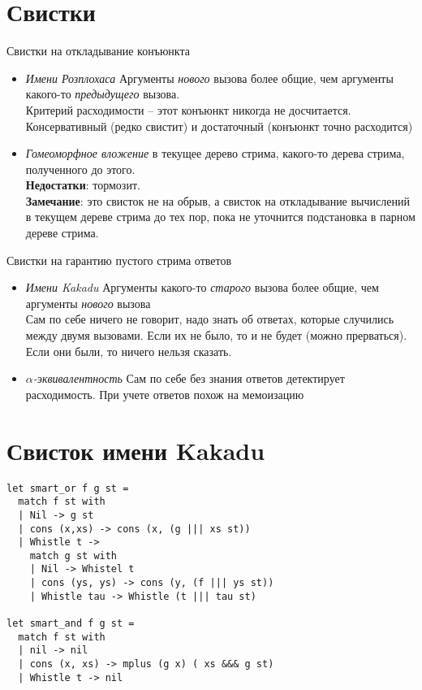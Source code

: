 \documentclass[a5paper,12pt]{article}
\begin{document}
\section{Свистки}

Свистки на откладывание конъюнкта
\begin{itemize}
\item \textit{Имени Розплохаса} Аргументы \textit{нового} вызова более общие, чем аргументы какого-то \textit{предыдущего} вызова.\\
Критерий расходимости -- этот конъюнкт никогда не досчитается.
Консервативный (редко свистит) и достаточный (конъюнкт точно расходится)

\item \textit{Гомеоморфное вложение} в текущее дерево стрима, какого-то дерева стрима, полученного до этого.\\
\textbf{Недостатки}: тормозит.\\
\textbf{Замечание}: это свисток не на обрыв, а свисток на откладывание вычислений в текущем дереве стрима до тех пор, пока не уточнится подстановка в парном дереве стрима.

\end{itemize}

Свистки на гарантию пустого стрима ответов
\begin{itemize}
\item \textit{Имени Kakadu} Аргументы какого-то \textit{старого} вызова более общие, чем аргументы \textit{нового } вызова\\
Сам по себе ничего не говорит, надо знать об ответах, которые случились между двумя вызовами. Если их не было, то и не будет (можно прерваться). Если они были, то ничего нельзя сказать.

\item \textit{$\alpha$-эквивалентность} Сам по себе без знания ответов детектирует расходимость. При учете ответов похож на мемоизацию

\end{itemize}

\section{Свисток имени Kakadu}

\begin{verbatim}
let smart_or f g st = 
  match f st with 
  | Nil -> g st 
  | cons (x,xs) -> cons (x, (g ||| xs st))
  | Whistle t -> 
    match g st with 
    | Nil -> Whistel t
    | cons (ys, ys) -> cons (y, (f ||| ys st))
    | Whistle tau -> Whistle (t ||| tau st)

let smart_and f g st = 
  match f st with 
  | nil -> nil 
  | cons (x, xs) -> mplus (g x) ( xs &&& g st)
  | Whistle t -> nil
\end{verbatim}
\end{document}
